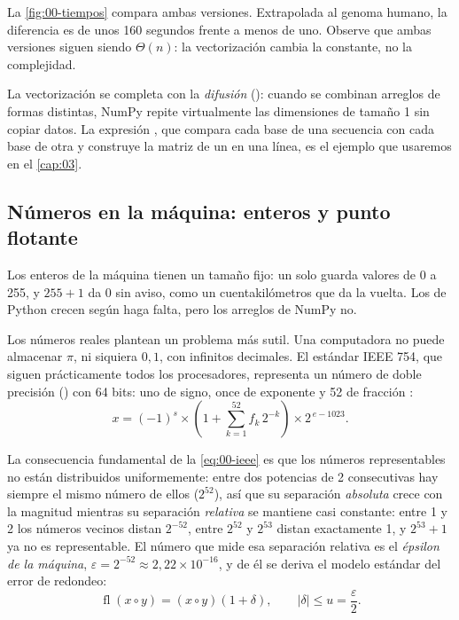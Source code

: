 La \cref{fig:00-tiempos} compara ambas versiones. Extrapolada al genoma humano, la diferencia es de unos 160 segundos frente a menos de uno. Observe que ambas versiones siguen siendo $\Theta(n)$: la vectorización cambia la constante, no la complejidad.

La vectorización se completa con la \emph{difusión} (): cuando se combinan arreglos de formas distintas, NumPy repite virtualmente las dimensiones de tamaño 1 sin copiar datos. La expresión , que compara cada base de una secuencia con cada base de otra y construye la matriz de un  en una línea, es el ejemplo que usaremos en el \cref{cap:03}.

\subsection{Números en la máquina: enteros y punto flotante}

Los enteros de la máquina tienen un tamaño fijo: un  solo guarda valores de 0 a 255, y $255+1$ da $0$ sin aviso, como un cuentakilómetros que da la vuelta. Los  de Python crecen según haga falta, pero los arreglos de NumPy no.

Los números reales plantean un problema más sutil. Una computadora no puede almacenar $\pi$, ni siquiera $0{,}1$, con infinitos decimales. El estándar IEEE 754, que siguen prácticamente todos los procesadores, representa un número de doble precisión () con 64 bits: uno de signo, once de exponente y 52 de fracción \parencite{c00-goldberg1991}:
\begin{equation}\label{eq:00-ieee}
x = (-1)^{s}\times\left(1 + \sum_{k=1}^{52} f_k\,2^{-k}\right)\times 2^{\,e-1023}.
\end{equation}

\begin{simbolos}
\end{simbolos}

La consecuencia fundamental de la \cref{eq:00-ieee} es que los números representables no están distribuidos uniformemente: entre dos potencias de 2 consecutivas hay siempre el mismo número de ellos ($2^{52}$), así que su separación \emph{absoluta} crece con la magnitud mientras su separación \emph{relativa} se mantiene casi constante: entre 1 y 2 los números vecinos distan $2^{-52}$, entre $2^{52}$ y $2^{53}$ distan exactamente 1, y $2^{53}+1$ ya no es representable. El número que mide esa separación relativa es el \emph{épsilon de la máquina}, $\varepsilon = 2^{-52}\approx 2{,}22\times10^{-16}$, y de él se deriva el modelo estándar del error de redondeo:
\begin{equation}\label{eq:00-redondeo}
\operatorname{fl}(x \circ y) = (x\circ y)(1+\delta), \qquad |\delta| \le u = \frac{\varepsilon}{2}.
\end{equation}

